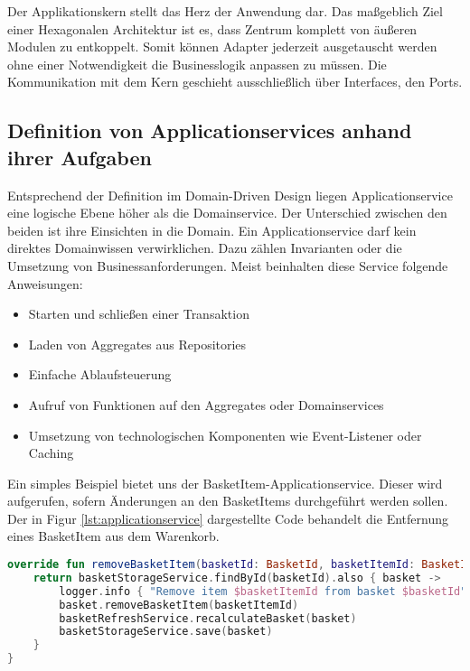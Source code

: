 Der Applikationskern stellt das Herz der Anwendung dar. Das maßgeblich Ziel einer Hexagonalen Architektur ist es, dass Zentrum komplett von äußeren Modulen zu entkoppelt. Somit können Adapter jederzeit ausgetauscht werden ohne einer Notwendigkeit die Businesslogik anpassen zu müssen. Die Kommunikation mit dem Kern geschieht ausschließlich über Interfaces, den Ports.

\subsection{Definition von Applicationservices anhand ihrer Aufgaben}

Entsprechend der Definition im Domain-Driven Design liegen Applicationservice eine logische Ebene höher als die Domainservice. Der Unterschied zwischen den beiden ist ihre Einsichten in die Domain. Ein Applicationservice darf kein direktes Domainwissen verwirklichen. Dazu zählen Invarianten oder die Umsetzung von Businessanforderungen.
Meist beinhalten diese Service folgende Anweisungen:

\begin{itemize}[noitemsep,nolistsep]
	\item Starten und schließen einer Transaktion
	\item Laden von Aggregates aus Repositories
	\item Einfache Ablaufsteuerung
	\item Aufruf von Funktionen auf den Aggregates oder Domainservices
	\item Umsetzung von technologischen Komponenten wie Event-Listener oder Caching
\end{itemize}

Ein simples Beispiel bietet uns der BasketItem-Applicationservice. Dieser wird aufgerufen, sofern Änderungen an den BasketItems durchgeführt werden sollen. Der in Figur \ref{lst:applicationservice} dargestellte Code behandelt die Entfernung eines BasketItem aus dem Warenkorb.

\begin{minipage}{\linewidth} %
	\begin{lstlisting}[caption={Eine Beispielsfunktion des BasketItem-Applikationservice}, label={lst:applicationservice}, language=Kotlin]
override fun removeBasketItem(basketId: BasketId, basketItemId: BasketItemId): Basket {
	return basketStorageService.findById(basketId).also { basket ->
		logger.info { "Remove item $basketItemId from basket $basketId" }
		basket.removeBasketItem(basketItemId)
		basketRefreshService.recalculateBasket(basket)
		basketStorageService.save(basket)
	}
}
	\end{lstlisting}
\end{minipage}

